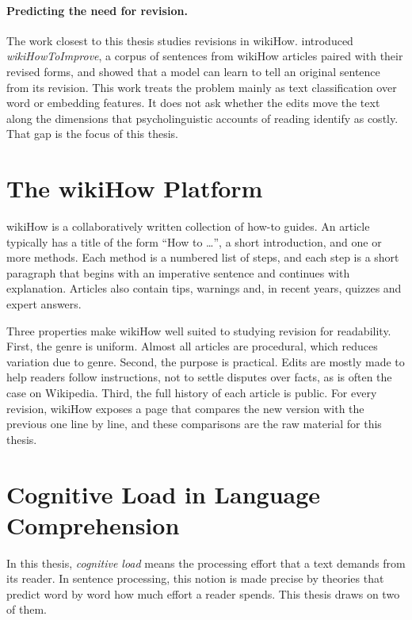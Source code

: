 \documentclass[12pt,a4paper,oneside]{report}
\begin{document}
\paragraph{Predicting the need for revision.} The work closest to this thesis studies revisions in wikiHow. \citet{anthonio2020} introduced \emph{wikiHowToImprove}, a corpus of sentences from wikiHow articles paired with their revised forms, and showed that a model can learn to tell an original sentence from its revision. This work treats the problem mainly as text classification over word or embedding features. It does not ask whether the edits move the text along the dimensions that psycholinguistic accounts of reading identify as costly. That gap is the focus of this thesis.

\section{The wikiHow Platform}
wikiHow is a collaboratively written collection of how-to guides. An article typically has a title of the form ``How to \ldots'', a short introduction, and one or more methods. Each method is a numbered list of steps, and each step is a short paragraph that begins with an imperative sentence and continues with explanation. Articles also contain tips, warnings and, in recent years, quizzes and expert answers.

Three properties make wikiHow well suited to studying revision for readability. First, the genre is uniform. Almost all articles are procedural, which reduces variation due to genre. Second, the purpose is practical. Edits are mostly made to help readers follow instructions, not to settle disputes over facts, as is often the case on Wikipedia. Third, the full history of each article is public. For every revision, wikiHow exposes a page that compares the new version with the previous one line by line, and these comparisons are the raw material for this thesis.

\section{Cognitive Load in Language Comprehension}
In this thesis, \emph{cognitive load} means the processing effort that a text demands from its reader. In sentence processing, this notion is made precise by theories that predict word by word how much effort a reader spends. This thesis draws on two of them.
\end{document}
